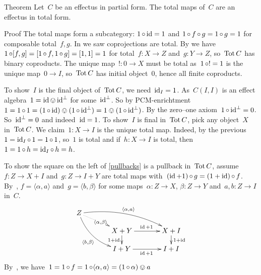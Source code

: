 \documentclass[b]{subfiles}
\begin{document}
\begin{parsec}
\begin{point}{Theorem}%
Let~$C$ be an effectus in partial form.
The total maps of~$C$ are an effectus in total form.
\begin{point}{Proof}%
The total maps form a subcategory: $1 \mathop{\circ} \operatorname{id} = 1$
    and $1 \mathop{\circ} f \mathop{\circ} g = 1 \mathop{\circ} g = 1$ for composable total~$f,g$.
In  we saw coprojections are total.
By 
    we have~$1 \mathop{\circ} [f,g] = [1 \mathop{\circ} f, 1 \mathop{\circ} g] = [1,1] = 1$
    for total~$f\colon X \to Z$ and~$g\colon Y \to Z$,
    so~$\operatorname{Tot} C$ has binary coproducts.
The unique map~$!\colon 0 \to X$ must be total
    as~$1 \mathop{\circ} ! = 1$ is the unique map~$0 \to I$,
    so~$\operatorname{Tot} C$ has initial object~$0$, hence all finite coproducts.
\end{point}
\begin{point}[one-m-is-id]%
To show~$I$ is the final object of~$\operatorname{Tot} C$,
    we need~$\operatorname{id}_I = 1$.
As~$C(I,I)$ is an effect algebra~$1 = \operatorname{id} \ovee \operatorname{id}^\perp$
    for some~$\operatorname{id}^\perp$.
So by PCM-enrichtment~$1 = 1 \mathop{\circ} 1 = (1 \mathop{\circ} \operatorname{id}) \ovee (1 \mathop{\circ}\operatorname{id}^\perp) = 
1 \ovee (1 \mathop{\circ} \operatorname{id}^\perp)$.
By the zero--one axiom~$1 \mathop{\circ} \operatorname{id}^\perp = 0$.
So~$\operatorname{id}^\perp = 0$ and indeed~$\operatorname{id} = 1$.
To show~$I$ is final in~$\operatorname{Tot} C$, pick any object~$X$ in~$\operatorname{Tot} C$.
We claim~$1 \colon X \to I$ is the unique total map.
Indeed, by the previous $1 = \operatorname{id}_I \mathop{\circ} 1 = 1 \mathop{\circ} 1$, so~$1$ is total
and if~$h\colon X \to I$ is total, then~$1=1 \mathop{\circ} h = \operatorname{id}_I \mathop{\circ} h = h$.
\end{point}
\begin{point}%
To show the square on the left of \eqref{pullbacks} is a pullback
    in~$\operatorname{Tot} C$,
assume~$f\colon Z \to X+I$ 
and~$g\colon Z \to I+Y$
are total maps with~$(\operatorname{id}+1) \mathop{\circ} g = (1+\operatorname{id}) \mathop{\circ} f$.
By~, $f = \langle \alpha, a \rangle$
    and~$g = \langle b, \beta \rangle$
    for some maps~$\alpha\colon Z \to X$, $\beta\colon Z \to Y$
        and~$a,b\colon Z \to I$ in~$C$.
\begin{equation*}
\xymatrix@C+1pc@R-1pc{ 
Z \ar@/^1pc/[rrd]^{\langle\alpha,a \rangle}
    \ar@/_1pc/[rdd]_{\langle b, \beta\rangle}
    \ar@{.>}[rd]|{\langle \alpha, \beta\rangle}
    \\
    &  X+Y \ar[r]^{\id+1} \ar[d]_{1+\id} & X+I\ar[d]^{1+\id} \\
    &I+Y\ar[r]_{\id+1} & I+I
    }
\end{equation*}
By~,
    we have~$1 = 1 \mathop{\circ} f = 1 \mathop{\circ} \langle \alpha, a\rangle
                = (1 \mathop{\circ} \alpha) \ovee a$

\end{point}
\end{point}
\end{parsec}
\end{document}
